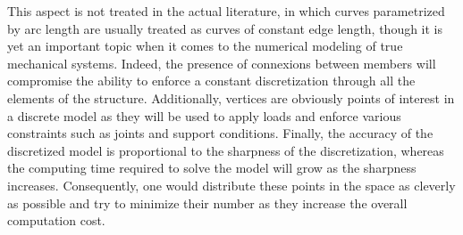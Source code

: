 
This aspect is not treated in the actual literature, in which curves parametrized by arc length are usually treated as curves of constant edge length, though it is yet an important topic when it comes to the numerical modeling of true mechanical systems. Indeed, the presence of connexions between members will compromise the ability to enforce a constant discretization through all the elements of the structure. Additionally, vertices are obviously points of interest in a discrete model as they will be used to apply loads and enforce various constraints such as joints and support conditions. Finally, the accuracy of the discretized model is proportional to the sharpness of the discretization, whereas the computing time required to solve the model will grow as the sharpness increases. Consequently, one would distribute these points in the space as cleverly as possible and try to minimize their number as they increase the overall computation cost.

